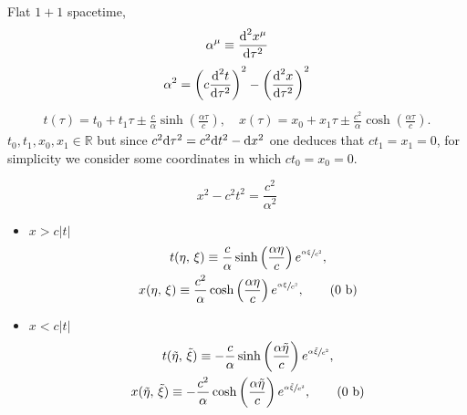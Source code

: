 Flat $1+1$ spacetime, 
\begin{equation}
	\alpha^\mu\equiv\frac{\text{d}^2x^\mu}{\text{d}\tau^2}
\end{equation}
\begin{equation}
	\alpha^2=\left(c\frac{\text{d}^2 t}{\text{d}\tau^2}\right)^2-\left(\frac{\text{d}^2x}{\text{d}\tau^2}\right)^2
\end{equation}
\begin{subequations}
	\begin{gather}
		t(\tau)=t_0+t_1\tau\pm\frac{c}{\alpha}\sinh\left(\frac{\alpha\tau}{c}\right),\quad x(\tau)=x_0+x_1\tau\pm\frac{c^2}{\alpha}\cosh\left(\frac{\alpha\tau}{c}\right).\tag{\theequation \,\,a,b}
	\end{gather}
\end{subequations}
$t_0,t_1,x_0,x_1\in\mathbb{R}$ but since $c^2\text{d}\tau^2=c^2\text{d} t^2-\text{d} x^2$ one deduces that $ct_1=x_1=0$, for simplicity we consider some coordinates in which $ct_0=x_0=0$.

\begin{equation}
	x^2-c^2t^2=\frac{c^2}{\alpha^2}
\end{equation}
\begin{wrapfigure}{r}{0.4\textwidth}
\end{wrapfigure}
\begin{itemize}
	\item $x>c|t|$
	\begin{subequations}
		\begin{gather}
			t(\eta,\,\xi)\equiv \frac{c}{\alpha}\sinh\left(\frac{\alpha\eta}{c}\right)e^{\sfrac{\alpha\xi}{c^2}},\\ x(\eta,\,\xi)\equiv \frac{c^2}{\alpha}\cosh\left(\frac{\alpha\eta}{c}\right)e^{\sfrac{\alpha\xi}{c^2}},\tag{\theequation \,\,b}
		\end{gather}
	\end{subequations}
	\item $x<c|t|$
	\begin{subequations}
		\begin{gather}
			t(\tilde\eta,\,\tilde\xi)\equiv- \frac{c}{\alpha}\sinh\left(\frac{\alpha\tilde\eta}{c}\right)e^{\sfrac{\alpha\tilde\xi}{c^2}},\\ x(\tilde\eta,\,\tilde\xi)\equiv -\frac{c^2}{\alpha}\cosh\left(\frac{\alpha\tilde\eta}{c}\right)e^{\sfrac{\alpha\tilde\xi}{c^2}},\tag{\theequation \,\,b}
		\end{gather}
	\end{subequations}
\end{itemize}


